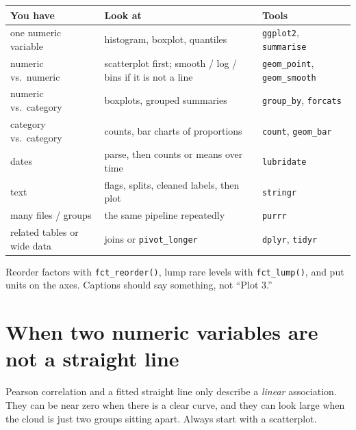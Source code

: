\documentclass[11pt, a4paper]{article}
\begin{document}
\begin{center}
\renewcommand{\arraystretch}{1.2}
\begin{tabularx}{\textwidth}{>{\raggedright\arraybackslash}p{1.45in} X >{\raggedright\arraybackslash}p{1.65in}}
\hline
\textbf{You have} & \textbf{Look at} & \textbf{Tools} \\
\hline
one numeric variable & histogram, boxplot, quantiles & \texttt{ggplot2}, \texttt{summarise} \\
numeric vs.\ numeric & scatterplot first; smooth / log / bins if it is not a line & \texttt{geom\_point}, \texttt{geom\_smooth} \\
numeric vs.\ category & boxplots, grouped summaries & \texttt{group\_by}, \texttt{forcats} \\
category vs.\ category & counts, bar charts of proportions & \texttt{count}, \texttt{geom\_bar} \\
dates & parse, then counts or means over time & \texttt{lubridate} \\
text & flags, splits, cleaned labels, then plot & \texttt{stringr} \\
many files / groups & the same pipeline repeatedly & \texttt{purrr} \\
related tables or wide data & joins or \texttt{pivot\_longer} & \texttt{dplyr}, \texttt{tidyr} \\
\hline
\end{tabularx}
\end{center}

Reorder factors with \texttt{fct\_reorder()}, lump rare levels with \texttt{fct\_lump()}, and put units on the axes. Captions should say something, not ``Plot 3.''

\section*{When two numeric variables are not a straight line}

Pearson correlation and a fitted straight line only describe a \emph{linear} association. They can be near zero when there is a clear curve, and they can look large when the cloud is just two groups sitting apart. Always start with a scatterplot.
\end{document}
